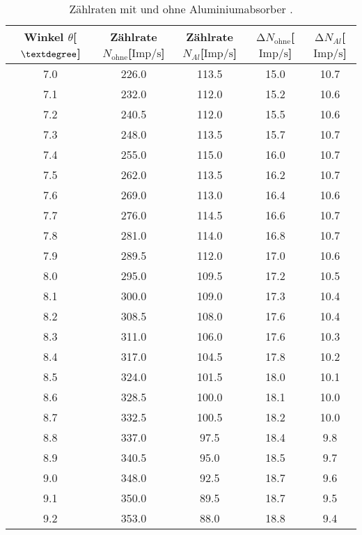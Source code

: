 \begin{table}
\centering
\caption{Zählraten mit und ohne Aluminiumabsorber \cite{hinweis}.}
\label{tab:alu}
\begin{tabular}{c c c c c}
    \toprule
    Winkel $\theta$[$\textdegree$] & Zählrate $N_{\text{ohne}}$[$\si{{\text{Imp}}\per\second}$] & Zählrate $N_{Al}$[$\si{{\text{Imp}}\per\second}$] & $\increment N_{\text{ohne}}$[$\si{{\text{Imp}}\per\second}$] & $\increment N_{Al}$[$\si{{\text{Imp}}\per\second}$]\\
    \midrule
    7.0&226.0&113.5   &  15.0    &   10.7    \\
    7.1&232.0&112.0   &  15.2    &   10.6    \\
    7.2&240.5&112.0   &  15.5    &   10.6    \\ 
    7.3&248.0&113.5   &  15.7    &   10.7    \\ 
    7.4&255.0&115.0   &  16.0    &   10.7    \\ 
    7.5&262.0&113.5   &  16.2    &   10.7    \\ 
    7.6&269.0&113.0   &  16.4    &   10.6    \\ 
    7.7&276.0&114.5   &  16.6    &   10.7    \\       
    7.8&281.0&114.0   &  16.8    &   10.7    \\    
    7.9&289.5&112.0   &  17.0    &   10.6    \\    
    8.0&295.0&109.5   &  17.2    &   10.5    \\    
    8.1&300.0&109.0   &  17.3    &   10.4    \\    
    8.2&308.5&108.0   &  17.6    &   10.4    \\    
    8.3&311.0&106.0   &  17.6    &   10.3    \\    
    8.4&317.0&104.5   &  17.8    &   10.2    \\    
    8.5&324.0&101.5   &  18.0    &   10.1    \\    
    8.6&328.5&100.0   &  18.1    &   10.0   \\    
    8.7&332.5&100.5   &  18.2    &   10.0    \\    
    8.8&337.0& 97.5   &  18.4    &    9.8    \\    
    8.9&340.5& 95.0   &  18.5    &    9.7   \\    
    9.0&348.0& 92.5   &  18.7    &    9.6    \\    
    9.1&350.0& 89.5   &  18.7    &    9.5    \\    
    9.2&353.0& 88.0   &  18.8    &    9.4    \\    

\end{tabular}
\end{table}
